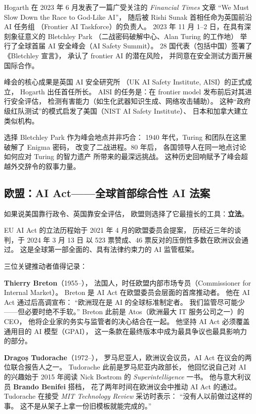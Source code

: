 Hogarth 在 2023 年 6 月发表了一篇广受关注的
\emph{Financial Times} 文章 ``We Must Slow Down the Race to God-Like AI''，
随后被 Rishi Sunak 首相任命为英国前沿 AI 任务组
（Frontier AI Taskforce）的负责人。
2023 年 11 月 1--2 日，在具有深刻象征意义的 Bletchley Park
（二战密码破解中心、Alan Turing 的工作地）
举行了全球首届 AI 安全峰会（AI Safety Summit）。
28 国代表（包括中国）签署了《Bletchley 宣言》，
承认了 frontier AI 的潜在风险，
并同意在安全测试方面开展国际合作。

峰会的核心成果是英国 AI 安全研究所
（UK AI Safety Institute, AISI）的正式成立，
Hogarth 出任首任所长。
AISI 的任务是：在 frontier model 发布前后对其进行安全评估，
检测有害能力（如生化武器知识生成、网络攻击辅助）。
这种``政府级红队测试''的模式启发了美国（NIST AI Safety Institute）、
日本和加拿大建立类似机构。

\begin{keybox}
选择 Bletchley Park 作为峰会地点并非巧合：
1940 年代，Turing 和团队在这里破解了 Enigma 密码，
改变了二战进程。80 年后，
各国领导人在同一地点讨论如何应对 Turing 的智力遗产
所带来的最深远挑战。
这种历史回响赋予了峰会超越外交辞令的叙事力量。
\end{keybox}

\subsection{欧盟：AI Act——全球首部综合性 AI 法案}

如果说美国靠行政令、英国靠安全评估，
欧盟则选择了它最擅长的工具：\textbf{立法}。

EU AI Act 的立法历程始于 2021 年 4 月的欧盟委员会提案，
历经近三年的谈判，于 2024 年 3 月 13 日
以 523 票赞成、46 票反对的压倒性多数在欧洲议会通过。
这是全球第一部全面的、具有法律约束力的 AI 监管框架。

三位关键推动者值得记录：

\textbf{Thierry Breton}（1955--），
法国人，时任欧盟内部市场专员（Commissioner for Internal Market）。
Breton 是 AI Act 在欧盟委员会层面的首席推动者。
他在 AI Act 通过后高调宣布：
``欧洲现在是 AI 的全球标准制定者。
我们监管尽可能少——但必要时绝不手软。''
Breton 此前是 Atos（欧洲最大 IT 服务公司之一）的 CEO，
他将企业家的务实与监管者的决心结合在一起。
他坚持 AI Act 必须覆盖通用目的 AI 模型（GPAI），
这一条款在最终版本中成为最具争议也最具影响力的部分。

\textbf{Dragoș Tudorache}（1972--），
罗马尼亚人，欧洲议会议员，AI Act 在议会的两位联合报告人之一。
Tudorache 此前是罗马尼亚内政部长，
他回忆说自己对 AI 的兴趣始于 2015 年阅读 Nick Bostrom 的
\emph{Superintelligence} 一书。
他与意大利议员 \textbf{Brando Benifei} 搭档，
花了两年时间在欧洲议会中推动 AI Act 的通过。
Tudorache 在接受 \emph{MIT Technology Review} 采访时表示：
``没有人以前做过这样的事。
这不是从架子上拿一份旧模板就能完成的。''

